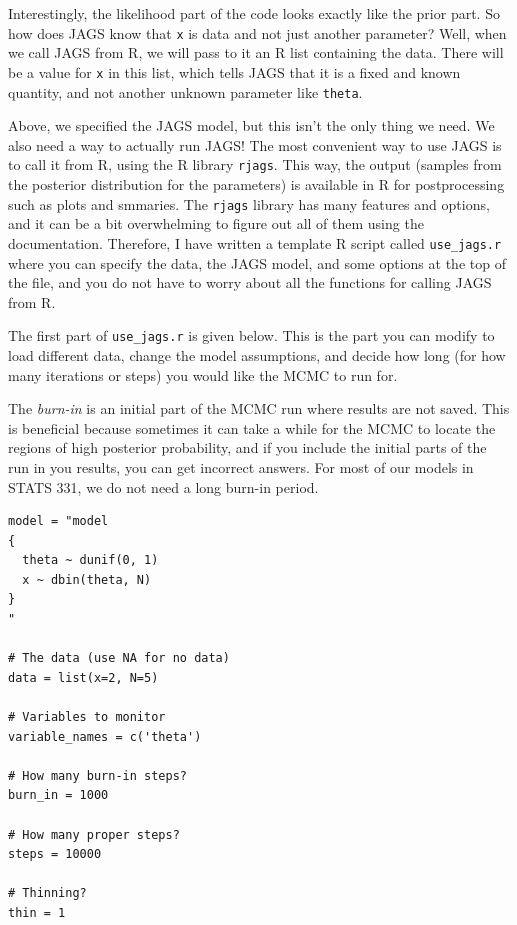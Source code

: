 Interestingly, the likelihood part of the code looks exactly like the
prior part. So how does JAGS know that {\tt x} is data and not just another
parameter? Well, when we call JAGS from R, we will pass to it an R list containing
the data. There will be a value for {\tt x} in this list, which tells JAGS that
it is a fixed and known quantity, and not another unknown parameter like {\tt theta}.

Above, we specified the JAGS model, but this isn't the only thing we need.
We also need a way to actually run JAGS! The most
convenient way to use JAGS is to call it from R, using the R library
{\tt rjags}. This way, the output (samples from the posterior distribution for
the parameters) is available in R for postprocessing such as plots and
smmaries. The
{\tt rjags} library has many features and options, and it can be a bit
overwhelming to figure out all of them using the documentation.
Therefore, I have written a template
R script called {\tt use\_jags.r} where you can specify the data, the JAGS
model, and some options at the
top of the file, and you do not have to worry about all the functions for
calling JAGS from R.

The first part of {\tt use\_jags.r} is given below. This is the part you
can modify to load different data, change the model assumptions, and decide
how long (for how many iterations or steps) you would like the MCMC to run for.

The {\it burn-in} is an initial part of the
MCMC run where results are not saved. This is beneficial because sometimes
it can take a while for the MCMC to locate the regions of high posterior
probability, and if you include the initial parts of the run in you results,
you can get incorrect answers. For most of our models in STATS 331, we do not
need a long burn-in period.

\begin{verbatim}
model = "model
{
  theta ~ dunif(0, 1)
  x ~ dbin(theta, N)
}
"

# The data (use NA for no data)
data = list(x=2, N=5)

# Variables to monitor
variable_names = c('theta')

# How many burn-in steps?
burn_in = 1000

# How many proper steps?
steps = 10000

# Thinning?
thin = 1
\end{verbatim}


